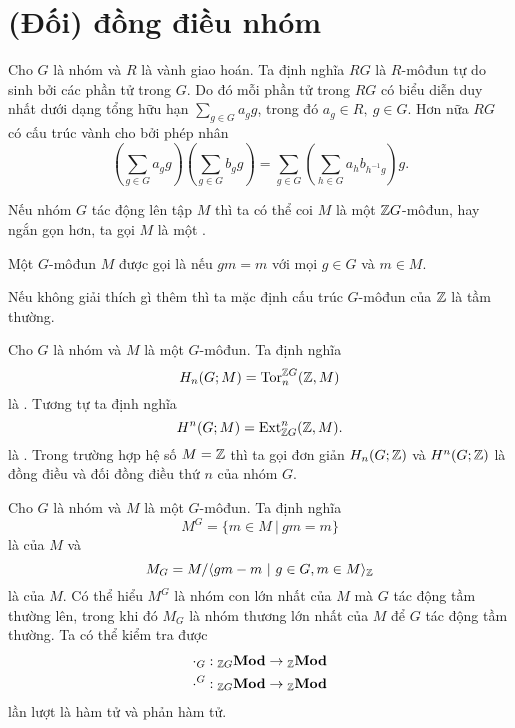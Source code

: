 \section{(Đối) đồng điều nhóm}

\begin{define}
    Cho $G$ là nhóm và $R$ là vành giao hoán. Ta định nghĩa  $RG$ là $R$-môđun tự do sinh bởi các phần tử trong $G$. Do đó mỗi phần tử trong $RG$ có biểu diễn duy nhất dưới dạng tổng hữu hạn $\sum_{g \in G} a_g g$, trong đó $a_g \in R,\ g \in G$. Hơn nữa $RG$ có cấu trúc vành cho bởi phép nhân
    $$
        \left(\sum_{g\in G}a_g g\right)\left(\sum_{g\in G}b_g g\right) = \sum_{g\in G} \left(\sum_{h \in G}a_h b_{h^{-1}g}\right) g.
    $$
\end{define}

\begin{define}
    Nếu nhóm $G$ tác động lên tập $M$ thì ta có thể coi $M$ là một $\mathbb Z G$-môđun, hay ngắn gọn hơn, ta gọi $M$ là một .
\end{define}

\begin{define}
    Một $G$-môđun $M$ được gọi là  nếu $gm = m$ với mọi $g \in G$ và $m \in M$.
\end{define}

Nếu không giải thích gì thêm thì ta mặc định cấu trúc $G$-môđun của $\mathbb Z$ là tầm thường.

\begin{define}
    Cho $G$ là nhóm và $M$ là một $G$-môđun. Ta định nghĩa
    $$
        H_n(G;M) = \operatorname{Tor}_n^{\mathbb Z G}(\mathbb Z,M)
    $$
    là . Tương tự ta định nghĩa
    $$
        H^n(G;M) = \operatorname{Ext}^n_{\mathbb Z G}(\mathbb Z,M).
    $$
    là . Trong trường hợp hệ số $M = \mathbb Z$ thì ta gọi đơn giản $H_n(G;\mathbb Z)$ và $H^n(G;\mathbb Z)$ là đồng điều và đối đồng điều thứ $n$ của nhóm $G$.
\end{define}

\begin{define}
    Cho $G$ là nhóm và $M$ là một $G$-môđun. Ta định nghĩa
    $$
        M^G = \{ m \in M\ |\ gm = m \}
    $$
    là  của $M$ và
    $$
        M_G = M / \langle g m - m\ |\ g \in G, m \in M \rangle_\mathbb Z
    $$
    là  của $M$. Có thể hiểu $M^G$ là nhóm con lớn nhất của $M$ mà $G$ tác động tầm thường lên, trong khi đó $M_G$ là nhóm thương lớn nhất của $M$ để  $G$ tác động tầm thường. Ta có thể kiểm tra được
    \begin{align*}
        \cdot_G: {}_{\mathbb Z G}\textbf{Mod} \rightarrow {}_{\mathbb Z}\textbf{Mod} \\
        \cdot^G: {}_{\mathbb Z G}\textbf{Mod} \rightarrow {}_{\mathbb Z}\textbf{Mod}
    \end{align*}
    lần lượt là hàm tử và phản hàm tử.
\end{define}

